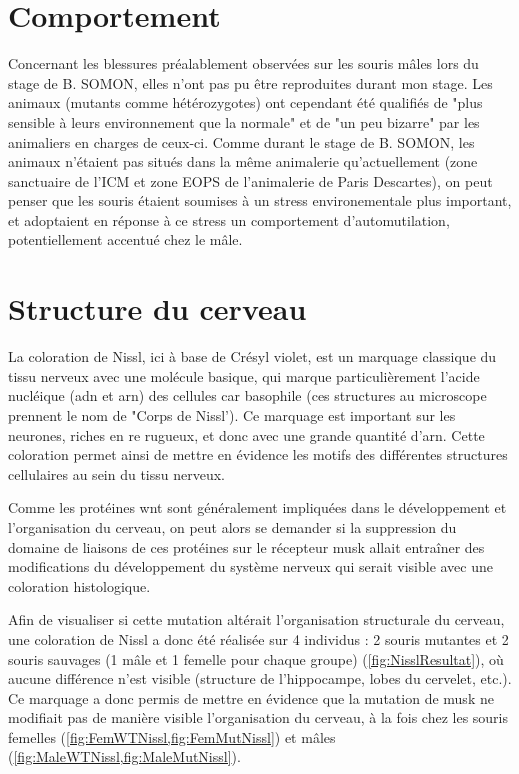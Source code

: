 \section{Comportement}
\label{sec:Comportement}
	Concernant les blessures préalablement observées sur les souris \mcrd mâles lors du stage de B. SOMON, elles n'ont pas pu être reproduites durant mon stage. Les animaux (mutants comme hétérozygotes) ont cependant été qualifiés de "plus sensible à leurs environnement que la normale" et de "un peu bizarre" par les animaliers en charges de ceux-ci. Comme durant le stage de B. SOMON, les animaux n'étaient pas situés dans la même animalerie qu'actuellement (zone sanctuaire de l'ICM et zone EOPS de l'animalerie de Paris Descartes), on peut penser que les souris étaient soumises à un stress environementale plus important, et adoptaient en réponse à ce stress un comportement d'automutilation, potentiellement accentué chez le mâle.

\section{Structure du cerveau}
\label{sec:NisslResultat}
	La coloration de Nissl, ici à base de Crésyl violet, est un marquage classique du tissu nerveux avec une molécule basique, qui marque particulièrement l'acide nucléique (\acrshort{adn} et \acrshort{arn}) des cellules car basophile (ces structures au microscope prennent le nom de "Corps de Nissl'). Ce marquage est important sur les neurones, riches en \gls{re} rugueux, et donc avec une grande quantité d'\acrshort{arn}. Cette coloration permet ainsi de mettre en évidence les motifs des différentes structures cellulaires au sein du tissu nerveux.

	Comme les protéines \gls{wnt} sont généralement impliquées dans le développement et l'organisation du cerveau, on peut alors se demander si la suppression du domaine de liaisons de ces protéines sur le récepteur \gls{musk} allait entraîner des modifications du développement du système nerveux qui serait visible avec une coloration histologique.

	Afin de visualiser si cette mutation \mcrd altérait l'organisation structurale du cerveau, une coloration de Nissl a donc été réalisée sur 4 individus : 2 souris mutantes et 2 souris sauvages (1 mâle et 1 femelle pour chaque groupe) (\cref{fig:NisslResultat}), où aucune différence n'est visible (structure de l'hippocampe, lobes du cervelet, etc.). Ce marquage a donc permis de mettre en évidence que la mutation de \gls{musk} ne modifiait pas de manière visible l'organisation du cerveau, à la fois chez les souris femelles (\cref{fig:FemWTNissl,fig:FemMutNissl}) et mâles (\cref{fig:MaleWTNissl,fig:MaleMutNissl}). 

